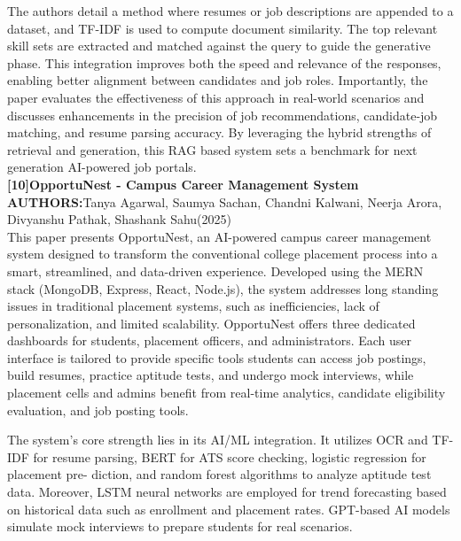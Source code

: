 \documentclass[a4paper, 12pt]{report}
\begin{document}
The authors detail a method where resumes or job descriptions are appended to a dataset, and TF-IDF is used to compute document similarity. The top relevant skill sets are extracted and matched against the query to guide the generative phase. This integration improves both the speed and relevance of the responses, enabling better alignment between candidates and job roles.
Importantly, the paper evaluates the effectiveness of this approach in real-world scenarios and discusses enhancements in the precision of job recommendations, candidate-job matching, and resume parsing accuracy. By leveraging the hybrid strengths of retrieval and generation, this RAG based system sets a benchmark for next generation AI-powered job portals.\\
\noindent\textbf{[10]OpportuNest - Campus Career Management System}\\
\textbf{AUTHORS:}Tanya Agarwal, Saumya Sachan, Chandni Kalwani, Neerja Arora, Divyanshu Pathak, Shashank Sahu(2025)\\
This paper presents OpportuNest, an AI-powered campus career management system designed to transform the conventional college placement process into a smart, streamlined, and data-driven experience. Developed using the MERN stack (MongoDB, Express, React, Node.js), the system addresses long standing issues in traditional placement systems, such as inefficiencies, lack of personalization, and limited scalability.
OpportuNest offers three dedicated dashboards for students, placement officers, and administrators. Each user interface is tailored to provide specific tools students can access job postings, build resumes, practice aptitude tests, and undergo mock interviews, while placement cells and admins benefit from real-time analytics, candidate eligibility evaluation, and job posting tools.

The system’s core strength lies in its AI/ML integration. It utilizes OCR and TF-IDF for resume parsing, BERT for ATS score checking, logistic regression for placement pre- diction, and random forest algorithms to analyze aptitude test data. Moreover, LSTM neural networks are employed for trend forecasting based on historical data such as enrollment and placement rates. GPT-based AI models simulate mock interviews to prepare students for real scenarios.
\end{document}
